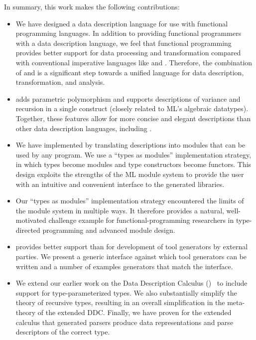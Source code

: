 In summary, this work makes the following contributions:
\begin{itemize}
\item We have designed a data description language for use with
  functional programming languages. In addition to providing
  functional programmers with a data description language, we
  feel that functional programming provides better support for data
  processing and transformation compared with conventional imperative
  languages like \C{} and \java{}. Therefore, the combination of
  \padsml{} and \ocaml{} is a significant step towards a unified
  language for data description, transformation, and analysis.
\item \padsml{} adds parametric polymorphism
  and supports descriptions of variance and recursion 
  in a single construct (closely related to ML's algebraic datatypes).
  Together, these features allow for more concise and elegant
  descriptions than other data description languages, including
  \padsc{}.
\item We have implemented \padsml{} by translating descriptions into
  \ocaml{} modules that can be used by any \ocaml{} program. We use a
  ``types as modules'' implementation strategy, in which
  \padsml{} types become modules and \padsml{} type constructors
  become functors. This design exploits the strengths of the ML module
  system to provide the user with an intuitive and convenient
  interface to the generated libraries.
\item Our ``types as modules'' implementation strategy encountered the
  limits of the \ocaml{} module system in multiple ways. It therefore
  provides a natural, well-motivated challenge example for
  functional-programming researchers in type-directed programming and
  advanced module design.
\item \padsml{} provides better support than \padsc{} for development of tool
  generators by external parties. We present a generic interface
  against which tool generators can be written and a number of
  examples generators that match the interface.
\item We extend our earlier work on the Data Description Calculus
  (\ddcold{})~\cite{fisher+:next700ddl} to include support for
  type-parameterized types. We also 
  substantially simplify the theory of recursive types, resulting in
  an overall simplification in the meta-theory of the extended DDC.
  Finally, we have proven for the extended calculus that generated
  parsers produce data representations and parse descriptors of the
  correct type.
\end{itemize}


